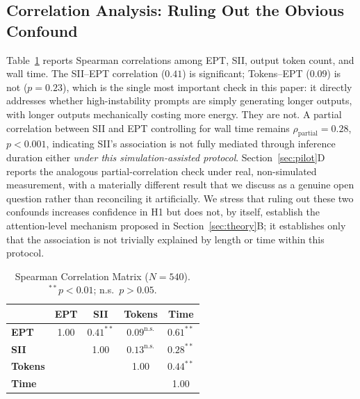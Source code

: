 \documentclass[conference]{IEEEtran}
\begin{document}
\subsection{Correlation Analysis: Ruling Out the Obvious Confound}
\label{sec:corr}
Table~\ref{tab:corr} reports Spearman correlations among EPT, SII,
output token count, and wall time. The SII--EPT correlation ($0.41$)
is significant; Tokens--EPT ($0.09$) is not ($p=0.23$), which is the
single most important check in this paper: it directly addresses
whether high-instability prompts are simply generating longer outputs,
with longer outputs mechanically costing more energy. They are not.
A partial correlation between SII and EPT controlling for wall time
remains $\rho_\text{partial}=0.28$, $p<0.001$, indicating SII's
association is not fully mediated through inference duration either
\emph{under this simulation-assisted protocol}. Section~\ref{sec:pilot}D
reports the analogous partial-correlation check under real,
non-simulated measurement, with a materially different result that we
discuss as a genuine open question rather than reconciling it
artificially.
We stress that ruling out these two confounds increases confidence in
H1 but does not, by itself, establish the attention-level mechanism
proposed in Section~\ref{sec:theory}B; it establishes only that the
association is not trivially explained by length or time within this
protocol.
\begin{table}[t]
\caption{Spearman Correlation Matrix ($N = 540$).
  $^{**}p < 0.01$; n.s.\ $p > 0.05$.}
\label{tab:corr}
\centering
\setlength{\tabcolsep}{4.5pt}
\begin{tabular}{@{}lcccc@{}}
\toprule
 & \textbf{EPT} & \textbf{SII} & \textbf{Tokens} & \textbf{Time} \\
\midrule
\textbf{EPT}    & 1.00 & $0.41^{**}$ & $0.09^{\text{n.s.}}$ & $0.61^{**}$ \\
\textbf{SII}    &      & 1.00        & $0.13^{\text{n.s.}}$ & $0.28^{**}$ \\
\textbf{Tokens} &      &             & 1.00                 & $0.44^{**}$ \\
\textbf{Time}   &      &             &                      & 1.00 \\
\bottomrule
\end{tabular}
\end{table}
\end{document}
